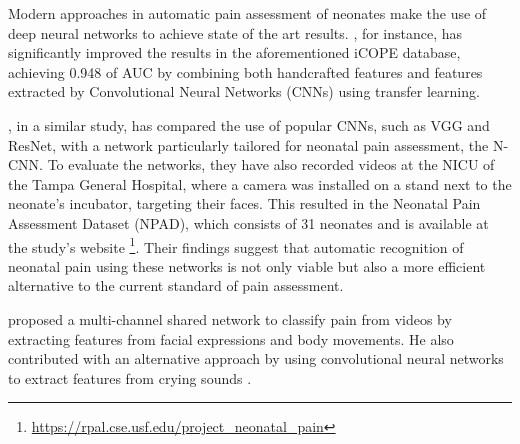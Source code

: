 Modern approaches in automatic pain assessment of neonates make the use of deep neural networks to achieve state of the art results. \cite{abs-1807-01631}, for instance, has significantly improved the results in the aforementioned iCOPE database, achieving 0.948 of AUC by combining both handcrafted features and features extracted by Convolutional Neural Networks (CNNs) using transfer learning.  

\cite{Zamzmi2019}, in a similar study, has compared the use of popular CNNs, such as VGG and ResNet, with a network particularly tailored for neonatal pain assessment, the N-CNN. To evaluate the networks, they have also recorded videos at the NICU of the Tampa General Hospital, where a camera was installed on a stand next to the neonate's incubator, targeting their faces. This resulted in the Neonatal Pain Assessment Dataset (NPAD), which consists of 31 neonates and is available at the study's website \footnote{\url{https://rpal.cse.usf.edu/project\_neonatal\_pain}}. Their findings suggest that automatic recognition of neonatal pain using these networks is not only viable but also a more efficient alternative to the current standard of pain assessment. 

\cite{SalekinZGKH019} proposed a multi-channel shared network to classify pain from videos by extracting features from facial expressions and body movements. He also contributed with an alternative approach by using convolutional neural networks to extract features from crying sounds \citep{abs-1909-02543}.